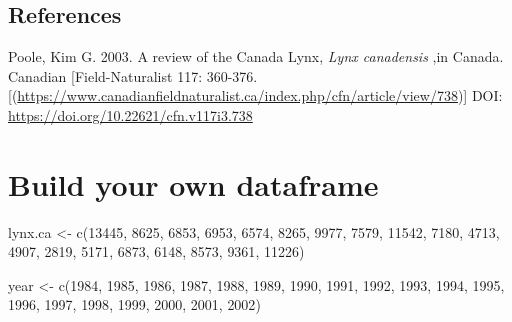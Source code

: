 \documentclass[
]{book}
\newenvironment{Shaded}{\begin{snugshade}}{\end{snugshade}}
\newcommand{\DecValTok}[1]{\textcolor[rgb]{0.00,0.00,0.81}{#1}}
\newcommand{\FunctionTok}[1]{\textcolor[rgb]{0.00,0.00,0.00}{#1}}
\newcommand{\NormalTok}[1]{#1}
\newcommand{\OtherTok}[1]{\textcolor[rgb]{0.56,0.35,0.01}{#1}}
\begin{document}
\hypertarget{references}{%
\section{References}\label{references}}

Poole, Kim G. 2003. A review of the Canada Lynx, \emph{Lynx canadensis} ,in Canada. Canadian {[}Field-Naturalist 117: 360-376.{[}(\url{https://www.canadianfieldnaturalist.ca/index.php/cfn/article/view/738}){]} DOI: \url{https://doi.org/10.22621/cfn.v117i3.738}

\hypertarget{build-your-own-dataframe}{%
\chapter{Build your own dataframe}\label{build-your-own-dataframe}}

\begin{Shaded}
\begin{Highlighting}[]
\NormalTok{lynx.ca }\OtherTok{\textless{}{-}} \FunctionTok{c}\NormalTok{(}\DecValTok{13445}\NormalTok{, }\DecValTok{8625}\NormalTok{, }\DecValTok{6853}\NormalTok{, }\DecValTok{6953}\NormalTok{, }\DecValTok{6574}\NormalTok{,}
  \DecValTok{8265}\NormalTok{, }\DecValTok{9977}\NormalTok{, }\DecValTok{7579}\NormalTok{, }\DecValTok{11542}\NormalTok{, }\DecValTok{7180}\NormalTok{,}
  \DecValTok{4713}\NormalTok{, }\DecValTok{4907}\NormalTok{, }\DecValTok{2819}\NormalTok{, }\DecValTok{5171}\NormalTok{, }\DecValTok{6873}\NormalTok{, }
  \DecValTok{6148}\NormalTok{, }\DecValTok{8573}\NormalTok{, }\DecValTok{9361}\NormalTok{, }\DecValTok{11226}\NormalTok{)}
\end{Highlighting}
\end{Shaded}

\begin{Shaded}
\begin{Highlighting}[]
\NormalTok{year }\OtherTok{\textless{}{-}} \FunctionTok{c}\NormalTok{(}\DecValTok{1984}\NormalTok{, }\DecValTok{1985}\NormalTok{, }\DecValTok{1986}\NormalTok{, }\DecValTok{1987}\NormalTok{,}
          \DecValTok{1988}\NormalTok{, }\DecValTok{1989}\NormalTok{, }\DecValTok{1990}\NormalTok{, }\DecValTok{1991}\NormalTok{, }\DecValTok{1992}\NormalTok{, }
          \DecValTok{1993}\NormalTok{, }\DecValTok{1994}\NormalTok{, }\DecValTok{1995}\NormalTok{, }\DecValTok{1996}\NormalTok{, }\DecValTok{1997}\NormalTok{,}
          \DecValTok{1998}\NormalTok{, }\DecValTok{1999}\NormalTok{, }\DecValTok{2000}\NormalTok{, }\DecValTok{2001}\NormalTok{, }\DecValTok{2002}\NormalTok{)}
\end{Highlighting}
\end{Shaded}
\end{document}
